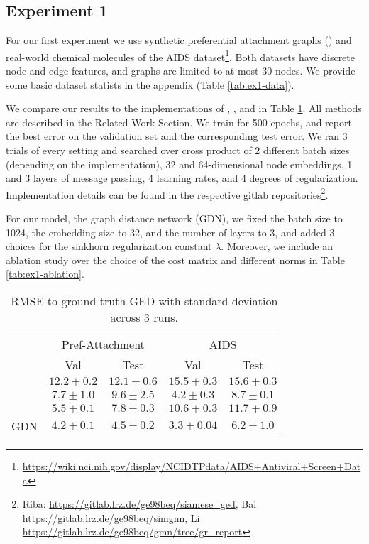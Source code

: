 \subsection{Experiment 1}

For our first experiment we use synthetic preferential attachment graphs (\citealp{pref_att2002}) and real-world chemical molecules of the AIDS dataset\footnote{\url{https://wiki.nci.nih.gov/display/NCIDTPdata/AIDS+Antiviral+Screen+Data}}. Both datasets have discrete node and edge features, and graphs are limited to at most 30 nodes. We provide some basic dataset statists in the appendix (Table \ref{tab:ex1-data}).

We compare our results to the implementations of \cite{riba2018}, \cite{bai2019}, and \cite{li2019} in Table \ref{tab:ex1-baselines}. All methods are described in the Related Work Section. We train for 500 epochs, and report the best error on the validation set and the corresponding test error. We ran 3 trials of every setting and searched over cross product of 2 different batch sizes (depending on the implementation), 32 and 64-dimensional node embeddings, 1 and 3 layers of message passing, 4 learning rates, and 4 degrees of regularization. Implementation details can be found in the respective gitlab repositories\footnote{Riba: \url{https://gitlab.lrz.de/ge98beq/siamese_ged}, Bai \url{https://gitlab.lrz.de/ge98beq/simgnn}, Li \url{https://gitlab.lrz.de/ge98beq/gmn/tree/gr_report}}.

For our model, the graph distance network (GDN), we fixed the batch size to 1024, the embedding size to 32, and the number of layers to 3, and added 3 choices for the sinkhorn regularization constant $\lambda$. Moreover, we include an ablation study over the choice of the cost matrix and different norms in Table \ref{tab:ex1-ablation}.

\begin{table}[htbp]
    \addtolength{\tabcolsep}{-1pt}
    \fontsize{9pt}{10.25pt}\selectfont
    \centering
    \renewcommand{\arraystretch}{1.2}
    \begin{tabular}{|l|c|c|c|c|}
        \hline
        \multirow{2}{*}{} & \multicolumn{2}{c|}{Pref-Attachment} & \multicolumn{2}{c|}{AIDS} \\ \hhline{|~|-|-|-|-|}
        & Val & Test & Val & Test \\ \hhline{|=|=|=|=|=|}
        \cite{riba2018} & $12.2 \pm 0.2$ & $12.1 \pm 0.6$ & $15.5 \pm 0.3$  & $15.6 \pm 0.3$ \\ \hline
        \cite{bai2019} & $7.7 \pm 1.0$ & $9.6 \pm 2.5$ & $4.2 \pm 0.3$ & $8.7 \pm 0.1$ \\ \hline
        \cite{li2019} & $5.5 \pm 0.1 $ & $7.8 \pm 0.3$ & $10.6 \pm 0.3$ & $11.7 \pm 0.9$ \\ \hline
        GDN & $4.2 \pm 0.1$ & $\boldsymbol{4.5 \pm 0.2}$ & $3.3 \pm 0.04$ & $\boldsymbol{6.2 \pm 1.0}$ \\ \hline
    \end{tabular}
    \caption{RMSE to ground truth GED with standard deviation across 3 runs.}
    \label{tab:ex1-baselines}
\end{table}

